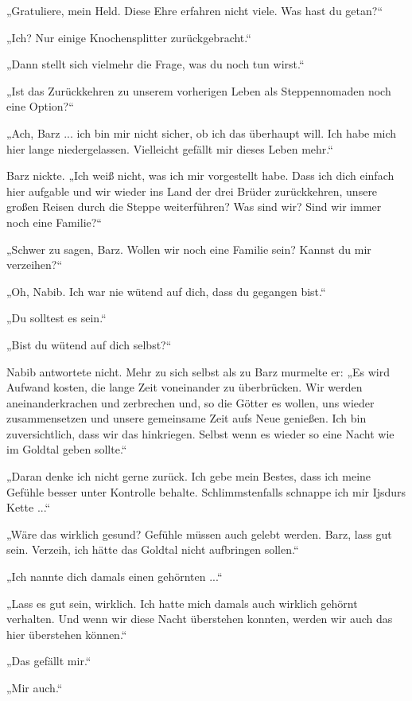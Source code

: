 „Gratuliere, mein Held. Diese Ehre erfahren nicht viele. Was hast du getan?“

„Ich? Nur einige Knochensplitter zurückgebracht.“

„Dann stellt sich vielmehr die Frage, was du noch tun wirst.“

„Ist das Zurückkehren zu unserem vorherigen Leben als Steppennomaden noch eine Option?“

„Ach, Barz ... ich bin mir nicht sicher, ob ich das überhaupt will. Ich habe mich hier lange niedergelassen. Vielleicht gefällt mir dieses Leben mehr.“

Barz nickte. „Ich weiß nicht, was ich mir vorgestellt habe. Dass ich dich einfach hier aufgable und wir wieder ins Land der drei Brüder zurückkehren, unsere großen Reisen durch die Steppe weiterführen? Was sind wir? Sind wir immer noch eine Familie?“

„Schwer zu sagen, Barz. Wollen wir noch eine Familie sein? Kannst du mir verzeihen?“

„Oh, Nabib. Ich war nie wütend auf dich, dass du gegangen bist.“

„Du solltest es sein.“

„Bist du wütend auf dich selbst?“

Nabib antwortete nicht. Mehr zu sich selbst als zu Barz murmelte er: „Es wird Aufwand kosten, die lange Zeit voneinander zu überbrücken. Wir werden aneinanderkrachen und zerbrechen und, so die Götter es wollen, uns wieder zusammensetzen und unsere gemeinsame Zeit aufs Neue genießen. Ich bin zuversichtlich, dass wir das hinkriegen. Selbst wenn es wieder so eine Nacht wie im Goldtal geben sollte.“

„Daran denke ich nicht gerne zurück. Ich gebe mein Bestes, dass ich meine Gefühle besser unter Kontrolle behalte. Schlimmstenfalls schnappe ich mir Ijsdurs Kette ...“

„Wäre das wirklich gesund? Gefühle müssen auch gelebt werden. Barz, lass gut sein. Verzeih, ich hätte das Goldtal nicht aufbringen sollen.“

„Ich nannte dich damals einen gehörnten ...“

„Lass es gut sein, wirklich. Ich hatte mich damals auch wirklich gehörnt verhalten. Und wenn wir diese Nacht überstehen konnten, werden wir auch das hier überstehen können.“

„Das gefällt mir.“

„Mir auch.“



\trennzeichen



